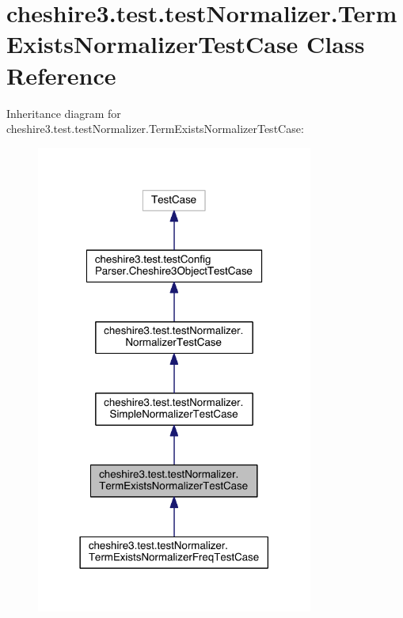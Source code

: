 \hypertarget{classcheshire3_1_1test_1_1test_normalizer_1_1_term_exists_normalizer_test_case}{\section{cheshire3.\-test.\-test\-Normalizer.\-Term\-Exists\-Normalizer\-Test\-Case Class Reference}
\label{classcheshire3_1_1test_1_1test_normalizer_1_1_term_exists_normalizer_test_case}
}


Inheritance diagram for cheshire3.\-test.\-test\-Normalizer.\-Term\-Exists\-Normalizer\-Test\-Case\-:
\nopagebreak
\begin{figure}[H]
\begin{center}
\leavevmode
\includegraphics[width=258pt]{classcheshire3_1_1test_1_1test_normalizer_1_1_term_exists_normalizer_test_case__inherit__graph}
\end{center}
\end{figure}


